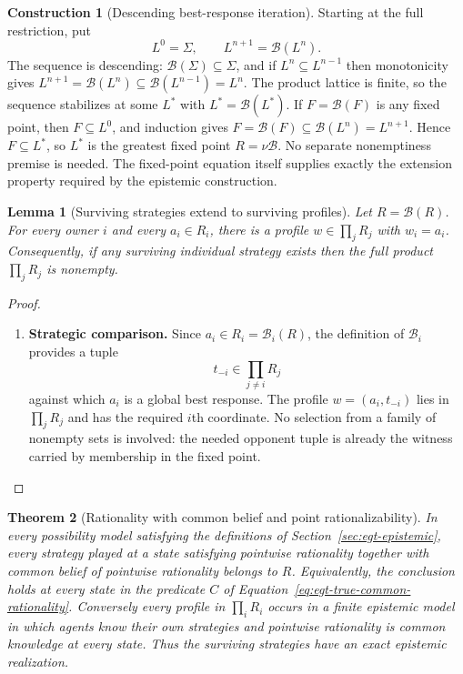 \documentclass[11pt,a4paper]{article}
\numberwithin{equation}{section}
\newtheorem{theorem}{Theorem}[section]
\newtheorem{lemma}[theorem]{Lemma}
\theoremstyle{definition}
\newtheorem{construction}[construction]{Construction}
\theoremstyle{remark}
\theoremstyle{plain}
\begin{document}
\begin{construction}[Descending best-response iteration]
Starting at the full restriction, put
\[
 L^0=\Sigma,
 \qquad
 L^{n+1}=\mathcal B(L^n).
\]
The sequence is descending: $\mathcal B(\Sigma)\subseteq\Sigma$, and if
$L^n\subseteq L^{n-1}$ then monotonicity gives
$L^{n+1}=\mathcal B(L^n)\subseteq\mathcal B(L^{n-1})=L^n$.
The product lattice is finite, so the sequence stabilizes at some $L^*$
with $L^*=\mathcal B(L^*)$. If $F=\mathcal B(F)$ is any fixed point, then
$F\subseteq L^0$, and induction gives
$F=\mathcal B(F)\subseteq\mathcal B(L^n)=L^{n+1}$. Hence
$F\subseteq L^*$, so $L^*$ is the greatest fixed point $R=\nu\mathcal B$.
No separate nonemptiness premise is needed. The fixed-point equation itself
supplies exactly the extension property required by the epistemic
construction.
\end{construction}

\begin{lemma}[Surviving strategies extend to surviving profiles]
\label{lem:egt-rationalizable-extension}
Let $R=\mathcal B(R)$. For every owner $i$ and every $a_i\in R_i$, there is a
profile $w\in\prod_jR_j$ with $w_i=a_i$. Consequently, if any surviving
individual strategy exists then the full product $\prod_jR_j$ is nonempty.
\end{lemma}
\begin{proof}
\leavevmode
\begin{enumerate}[label=\textup{(\arabic*)},leftmargin=*,itemsep=4pt,topsep=3pt]
  \item \textbf{Strategic comparison.} Since $a_i\in R_i=\mathcal B_i(R)$, the definition of $\mathcal B_i$
provides a tuple
\[
 t_{-i}\in\prod_{j\ne i}R_j
\]
against which $a_i$ is a global best response. The profile
$w=(a_i,t_{-i})$ lies in $\prod_jR_j$ and has the required $i$th coordinate. No selection from a family of nonempty sets is involved: the needed opponent
tuple is already the witness carried by membership in the fixed point.
\end{enumerate}
\end{proof}

\begin{theorem}[Rationality with common belief and point rationalizability]
\label{thm:egt-epistemic-exact}
In every possibility model satisfying the definitions of
Section~\ref{sec:egt-epistemic}, every strategy played at a state satisfying
pointwise rationality together with common belief of pointwise rationality
belongs to $R$. Equivalently, the conclusion holds at every state in the
predicate $C$ of Equation~\eqref{eq:egt-true-common-rationality}.
Conversely every profile in $\prod_iR_i$ occurs in a finite epistemic model
in which agents know their own strategies and pointwise rationality is
common knowledge at every state. Thus the surviving strategies have an exact
epistemic realization.
\end{theorem}
\end{document}
